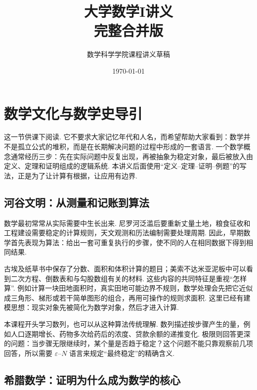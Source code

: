 \documentclass[fontset=fandol]{ctexart}
\title{大学数学I讲义\\完整合并版}
\author{数学科学学院课程讲义草稿}
\date{\today}
\newcounter{DefinitionCounter}[section]
\newcounter{TheoremCounter}[section]
\newcounter{PropositionCounter}[section]
\newcounter{ExampleCounter}[section]
\newcounter{ExerciseCounter}[section]
\newcounter{ProblemCounter}[section]
\newcounter{ConclusionCounter}[section]
\newcommand{\renewEnvironmentCounter}{\setcounter{DefinitionCounter}{0}\setcounter{TheoremCounter}{0}\setcounter{PropositionCounter}{0}\setcounter{ExampleCounter}{0}\setcounter{ExerciseCounter}{0}\setcounter{ProblemCounter}{0}\setcounter{ConclusionCounter}{0}}
\begin{document}
\maketitle
\vspace{-1em}

\renewcommand{\contentsname}{\hspace*{\fill}\Large\bfseries 目\quad 录 \hspace*{\fill}}
\setcounter{tocdepth}{2}
\tableofcontents
\clearpage

\section{数学文化与数学史导引}
\renewEnvironmentCounter

这一节供课下阅读. 它不要求大家记忆年代和人名，而希望帮助大家看到：数学并不是孤立公式的堆积，而是在长期解决问题的过程中形成的一套语言. 一个数学概念通常经历三步：先在实际问题中反复出现，再被抽象为稳定对象，最后被放入由定义、定理和证明组成的逻辑系统. 本讲义后面使用“定义--定理--证明--例题”的写法，正是为了让计算有根据，让应用有边界.

\subsection{河谷文明：从测量和记账到算法}

数学最初常常从实际需要中生长出来. 尼罗河泛滥后要重新丈量土地，粮食征收和工程建设需要稳定的计算规则，天文观测和历法编制需要处理周期. 因此，早期数学首先表现为算法：给出一套可重复执行的步骤，使不同的人在相同数据下得到相同结果.

古埃及纸草书中保存了分数、面积和体积计算的题目；美索不达米亚泥板中可以看到二次方程、倒数表和与勾股数组有关的材料. 这些内容的共同特征是重视“怎样算”. 例如计算一块田地面积时，真实田地可能边界不规则，数学处理会先把它近似成三角形、梯形或若干简单图形的组合，再用可操作的规则求面积. 这里已经有建模思想：现实对象先被简化为数学对象，然后才进入计算.

本课程开头学习数列，也可以从这种算法传统理解. 数列描述按步骤产生的量，例如人口逐期增长、药物多次给药后的浓度、贷款余额的递推变化. 极限则回答更深的问题：当步骤无限继续时，某个量是否趋于稳定？这个问题不能只靠观察前几项回答，所以需要 $\varepsilon$--$N$ 语言来规定“最终稳定”的精确含义.

\subsection{希腊数学：证明为什么成为数学的核心}
\end{document}
